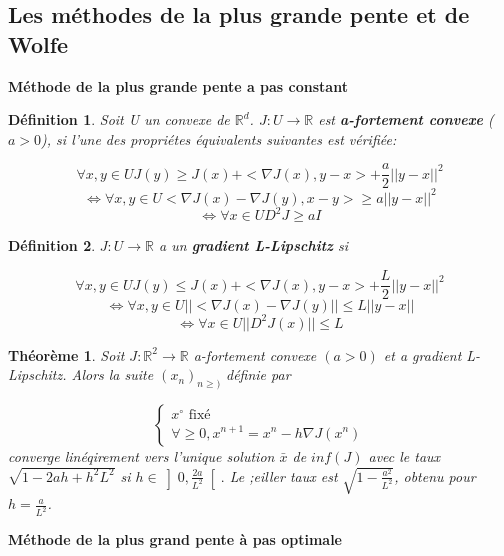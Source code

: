 \documentclass[10pt,a4paper]{article}%
\theoremstyle{theorem}
\newtheorem{theorem}{Théorème}
\newtheorem{definition}{Définition}
\theoremstyle{definition}
\begin{document}
		\subsection{Les méthodes de la plus grande pente et de Wolfe}\label{PGP}
		
		\textbf{Méthode de la plus grande pente a pas constant}
			\begin{definition}
				Soit U un convexe de $\mathbb{R}^d$. $J:U \to \mathbb{R}$ est \textbf{a-fortement convexe} ($a>0$), si  l'une des propriétes équivalents suivantes est vérifiée:
				
				\[\forall x,y \in U  J(y)\ge J(x)+<\nabla J(x),y-x>+\frac{a}{2}||y-x||^2\]
				\[\Leftrightarrow \forall x,y \in U  <\nabla J(x)-\nabla J(y),x-y> \ge a ||y-x||^2\]
				\[\Leftrightarrow \forall x \in U  D^2J \ge aI\]
				
			\end{definition}
		
			\begin{definition}
				$J:U\to \mathbb{R}$ a un \textbf{gradient L-Lipschitz} si 
				
				\[\forall x,y \in U  J(y)\le J(x)+<\nabla J(x),y-x>+\frac{L}{2}||y-x||^2\]
				\[\Leftrightarrow \forall x,y \in U ||<\nabla J(x)-\nabla J(y)|| \le L ||y-x||\]
				\[\Leftrightarrow \forall x \in U  ||D^2J(x)|| \le L\]
				
			\end{definition}
		
			\begin{theorem}
				
				Soit $J:\mathbb{R}^2\to \mathbb{R}$ a-fortement convexe $(a>0)$ et a gradient L-Lipschitz. Alors la suite $(x_n)_{n\ge )}$ définie par 
				
				\begin{equation}
					\begin{cases*}
						x^\circ \text{ fixé}
						\\
						\forall\ge 0,  x^{n+1}=x^n-h\nabla J(x^n)
					\end{cases*}
				\end{equation}
				converge linéqirement vers l'unique solution $\bar{x}$ de $inf(J)$ avec le taux $\sqrt{1-2ah+h^2L^2}$ si $h \in \left] 0,\frac{2a}{L^2}\right[.$ Le ;eiller taux est $\sqrt{1-\frac{a^2}{L^2}}$, obtenu pour $h=\frac{a}{L^2}$.
				
			\end{theorem}
		
			\textbf{Méthode de la plus grand pente à pas optimale}
			
\end{document}
